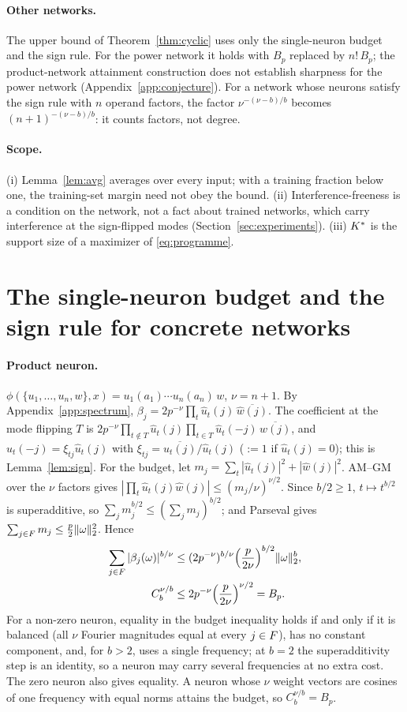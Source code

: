 \paragraph{Other networks.} The upper bound of Theorem~\ref{thm:cyclic} uses only the single-neuron budget and the sign rule. For the power network it holds with $B_p$ replaced by $n!\,B_p$; the product-network attainment construction does not establish sharpness for the power network (Appendix~\ref{app:conjecture}). For a network whose neurons satisfy the sign rule with $n$ operand factors, the factor $\nu^{-(\nu-b)/b}$ becomes $(n+1)^{-(\nu-b)/b}$: it counts factors, not degree.

\paragraph{Scope.} (i) Lemma~\ref{lem:avg} averages over every input; with a training fraction below one, the training-set margin need not obey the bound. (ii) Interference-freeness is a condition on the network, not a fact about trained networks, which carry interference at the sign-flipped modes (Section~\ref{sec:experiments}). (iii) $K^{*}$ is the support size of a maximizer of \eqref{eq:programme}.

\section{The single-neuron budget and the sign rule for concrete networks}\label{app:models}

\paragraph{Product neuron.} $\phi(\{u_1,\dots,u_n,w\},x)=u_1(a_1)\cdots u_n(a_n)\,w$, $\nu=n+1$. By Appendix~\ref{app:spectrum}, $\beta_j=2p^{-\nu}\prod_t\hat u_t(j)\,\overline{\hat w(j)}$. The coefficient at the mode flipping $T$ is $2p^{-\nu}\prod_{t\notin T}\hat u_t(j)\prod_{t\in T}\hat u_t(-j)\,\overline{\hat w(j)}$, and $\hat u_t(-j)=\xi_{tj}\hat u_t(j)$ with $\xi_{tj}=\overline{\hat u_t(j)}/\hat u_t(j)$ ($:=1$ if $\hat u_t(j)=0$); this is Lemma~\ref{lem:sign}. For the budget, let $m_j=\sum_t|\hat u_t(j)|^2+|\hat w(j)|^2$. AM--GM over the $\nu$ factors gives $|\prod_t\hat u_t(j)\hat w(j)|\le(m_j/\nu)^{\nu/2}$. Since $b/2\ge1$, $t\mapsto t^{b/2}$ is superadditive, so $\sum_jm_j^{b/2}\le(\sum_jm_j)^{b/2}$; and Parseval gives $\sum_{j\in F}m_j\le\frac p2\|\omega\|_2^2$. Hence
\[
\begin{aligned}
\sum_{j\in F}|\beta_j(\omega)|^{b/\nu}
&\le(2p^{-\nu})^{b/\nu}\Big(\frac p{2\nu}\Big)^{b/2}\|\omega\|_2^b,\\
C_b^{\nu/b}&\le2p^{-\nu}\Big(\frac p{2\nu}\Big)^{\nu/2}=B_p.
\end{aligned}
\]
For a non-zero neuron, equality in the budget inequality holds if and only if it is balanced (all $\nu$ Fourier magnitudes equal at every $j\in F$), has no constant component, and, for $b>2$, uses a single frequency; at $b=2$ the superadditivity step is an identity, so a neuron may carry several frequencies at no extra cost. The zero neuron also gives equality. A neuron whose $\nu$ weight vectors are cosines of one frequency with equal norms attains the budget, so $C_b^{\nu/b}=B_p$.

